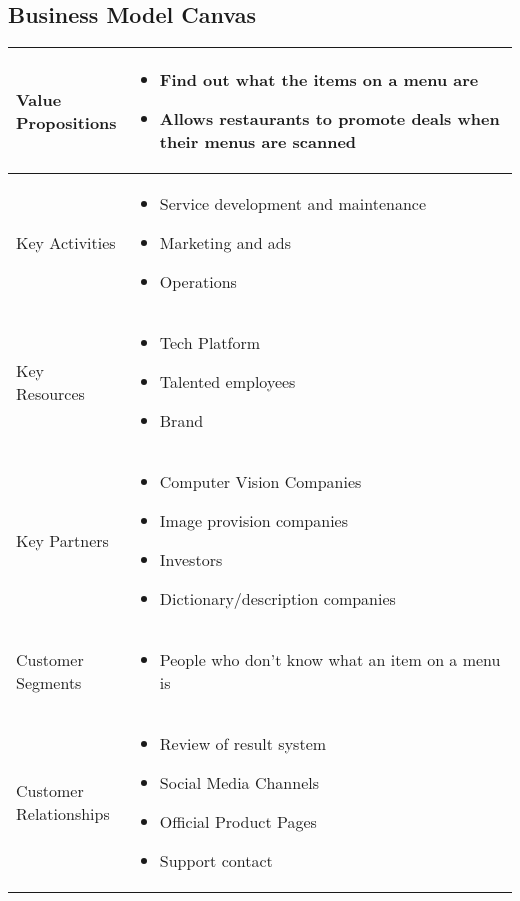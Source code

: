 \documentclass{article}[18pt]
\begin{document}
\begin{appendices}
\subsection{Business Model Canvas}
\label{appendix:BMC}
\begin{center}
{\renewcommand{\arraystretch}{2}
\begin{tabular}{| m{0.2\linewidth} |m{0.8\linewidth}|}
\hline
Value Propositions&
\begin{itemize}
	\item Find out what the items on a menu are
	\item Allows restaurants to promote deals when their menus are scanned
\end{itemize}\\
\hline
Key Activities&
\begin{itemize}
	\item Service development and maintenance
	\item Marketing and ads
	\item Operations
\end{itemize}\\
\hline
Key Resources&
\begin{itemize}
	\item Tech Platform
	\item Talented employees
	\item Brand
\end{itemize}\\
\hline
Key Partners&
\begin{itemize}
	\item Computer Vision Companies
	\item Image provision companies
	\item Investors
	\item Dictionary/description companies
\end{itemize}\\
\hline
Customer Segments&
\begin{itemize}
	\item People who don't know what an item on a menu is
\end{itemize}\\
\hline
Customer Relationships&
\begin{itemize}
	\item Review of result system
	\item Social Media Channels
	\item Official Product Pages
	\item Support contact
\end{itemize}\\

\end{tabular}}
\end{center}
\end{appendices}
\end{document}
